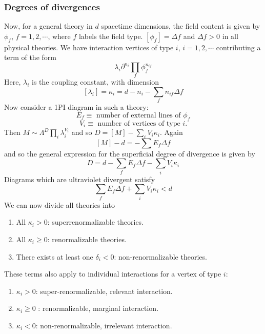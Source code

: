 \subsubsection{Degrees of divergences}
Now, for a general theory in $d$ spacetime dimensions, the field content is given by $\phi_f$, $f=1,2,\cdots$, where $f$ labels
the field type. $[\phi_f]=\Delta f$ and $\Delta f > 0$ in all physical theories. We have interaction vertices of type $i$, $i = 1,2,\cdots$
contributing a term of the form
\[\lambda_i \partial^{n_i} \prod_f \phi_f^{n_{if}}\]
Here, $\lambda_i$ is the coupling constant, with dimension
\[[\lambda_i] = \kappa_i = d - n_i - \sum_f n_{if}\Delta f \]
Now consider a 1PI diagram in such a theory:
\[E_f \equiv \mbox{ number of external lines of } \phi_f\]
\[V_i \equiv \mbox{ number of vertices of type } i.\]
Then $M \sim \Lambda^D \prod_i \lambda_i ^{V_i}$ and so $D = [M] - \sum_i V_i \kappa_i$. Again
\[[M] - d = -\sum E_f \Delta f\]
and so the general expression for the superficial degree of divergence is given by
\[D = d - \sum_f E_f \Delta f - \sum_i V_i \kappa_i\]
Diagrams which are ultraviolet divergent satisfy
\[\sum_f E_f \Delta f + \sum_i V_i \kappa_i < d\]
We can now divide all theories into
\begin{enumerate}
\item All $\kappa_i > 0$: superrenormalizable theories.
\item All $\kappa_i \geq 0$: renormalizable theories.
\item There exists at least one $\delta_i < 0$: non-renormalizable theories.
\end{enumerate}
These terms also apply to individual interactions for a vertex of type $i$:
\begin{enumerate}
\item $\kappa_i > 0$: super-renormalizable, relevant interaction.
\item $\kappa_i \geq 0$ : renormalizable, marginal interaction.
\item $\kappa_i < 0$: non-renormalizable, irrelevant interaction.
\end{enumerate}


